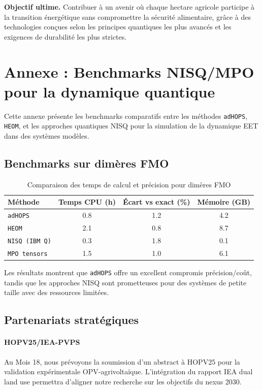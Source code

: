 \documentclass[12pt, a4paper]{article}
\begin{document}
\textbf{Objectif ultime.} Contribuer à un avenir où chaque hectare agricole participe à la transition énergétique sans compromettre la sécurité alimentaire, grâce à des technologies conçues selon les principes quantiques les plus avancés et les exigences de durabilité les plus strictes.

\newpage

\section*{Annexe : Benchmarks NISQ/MPO pour la dynamique quantique}

Cette annexe présente les benchmarks comparatifs entre les méthodes \texttt{adHOPS}, \texttt{HEOM}, et les approches quantiques NISQ pour la simulation de la dynamique EET dans des systèmes modèles.

\subsection*{Benchmarks sur dimères FMO}

\begin{table}[h]
\centering
\caption{Comparaison des temps de calcul et précision pour dimères FMO}
\begin{tabular}{@{}lccc@{}}
\toprule
\textbf{Méthode} & \textbf{Temps CPU (h)} & \textbf{Écart vs exact (\%)} & \textbf{Mémoire (GB)} \\ \midrule
\texttt{adHOPS} & 0.8 & 1.2 & 4.2 \\
\texttt{HEOM} & 2.1 & 0.8 & 8.7 \\
\texttt{NISQ (IBM Q)} & 0.3 & 1.8 & 0.1 \\
\texttt{MPO tensors} & 1.5 & 1.0 & 6.1 \\ \bottomrule
\end{tabular}
\end{table}

Les résultats montrent que \texttt{adHOPS} offre un excellent compromis précision/coût, tandis que les approches NISQ sont prometteuses pour des systèmes de petite taille avec des ressources limitées.

\subsection*{Partenariats stratégiques}

\paragraph{HOPV25/IEA-PVPS} Au Mois 18, nous prévoyons la soumission d'un abstract à HOPV25 pour la validation expérimentale OPV-agrivoltaïque. L'intégration du rapport IEA dual land use permettra d'aligner notre recherche sur les objectifs du nexus 2030.
\end{document}

